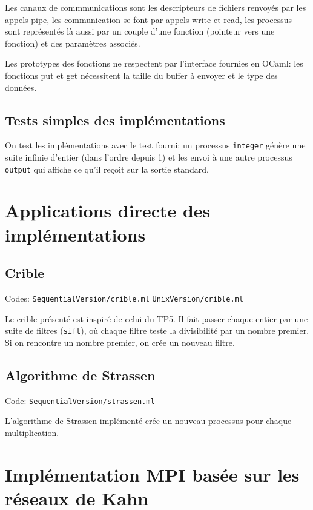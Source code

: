 \documentclass[a4paper]{article}
\begin{document}
Les canaux de commmunications sont les descripteurs de fichiers renvoyés par les appels pipe, les communication se font par appels write et read, les processus sont représentés là aussi par un couple d'une fonction (pointeur vers une fonction) et des paramètres associés.

Les prototypes des fonctions ne respectent par l'interface fournies en OCaml: les fonctions put et get nécessitent la taille du buffer à envoyer et le type des données.

\subsection{Tests simples des implémentations}

On test les implémentations avec le test fourni: un processus \verb|integer| génère une suite infinie d'entier (dans l'ordre depuis 1) et les envoi à une autre processus \verb|output| qui affiche ce qu'il reçoit sur la sortie standard.

\section{Applications directe des implémentations}

\subsection{Crible}

Codes: \verb|SequentialVersion/crible.ml| \verb|UnixVersion/crible.ml|

Le crible présenté est inspiré de celui du TP5. Il fait passer chaque entier par une suite de filtres (\texttt{sift}), où chaque filtre teste la divisibilité par un nombre premier. Si on rencontre un nombre premier, on crée un nouveau filtre.

\subsection{Algorithme de Strassen}

Code: \verb|SequentialVersion/strassen.ml|

L'algorithme de Strassen implémenté crée un nouveau processus pour chaque multiplication.

\section{Implémentation MPI basée sur les réseaux de Kahn}
\end{document}
